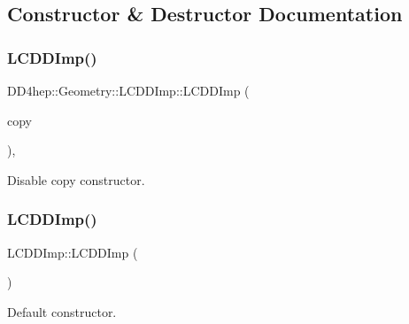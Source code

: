\subsection{Constructor \& Destructor Documentation}
\hypertarget{class_d_d4hep_1_1_geometry_1_1_l_c_d_d_imp_ae7964335abcf478a0313d4974cddef69}{}\label{class_d_d4hep_1_1_geometry_1_1_l_c_d_d_imp_ae7964335abcf478a0313d4974cddef69} 
\subsubsection{\texorpdfstring{L\+C\+D\+D\+Imp()}{LCDDImp()}\hspace{0.1cm}{\footnotesize\ttfamily [1/2]}}
{\footnotesize\ttfamily D\+D4hep\+::\+Geometry\+::\+L\+C\+D\+D\+Imp\+::\+L\+C\+D\+D\+Imp (\begin{DoxyParamCaption}\item[{const \hyperlink{class_d_d4hep_1_1_geometry_1_1_l_c_d_d_imp}{L\+C\+D\+D\+Imp} \&}]{copy }\end{DoxyParamCaption})\hspace{0.3cm}{\ttfamily [private]}, {\ttfamily [delete]}}



Disable copy constructor. 

\hypertarget{class_d_d4hep_1_1_geometry_1_1_l_c_d_d_imp_ac9cfc0155701a769a74fcf67d58d8749}{}\label{class_d_d4hep_1_1_geometry_1_1_l_c_d_d_imp_ac9cfc0155701a769a74fcf67d58d8749} 
\subsubsection{\texorpdfstring{L\+C\+D\+D\+Imp()}{LCDDImp()}\hspace{0.1cm}{\footnotesize\ttfamily [2/2]}}
{\footnotesize\ttfamily L\+C\+D\+D\+Imp\+::\+L\+C\+D\+D\+Imp (\begin{DoxyParamCaption}{ }\end{DoxyParamCaption})}



Default constructor. 



